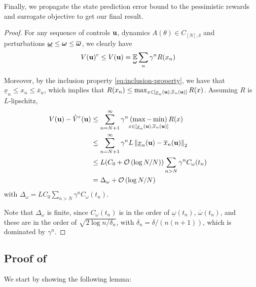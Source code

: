 \documentclass{article}
\begin{document}
Finally, we propagate the state prediction error bound to the pessimistic rewards and surrogate objective to get our final result.
\begin{proof}
  
 For any sequence of controls $\mathbf{u}$, dynamics $A(\theta)\in C_{[N],\delta}$ and perturbations $\underline{\bm{\omega}} \leq \bm{\omega} \leq \overline{\bm{\omega}}$, we clearly have 
 \[V(\mathbf{u})^r \leq V(\mathbf{u}) = \operatorname*{\mathbb{E}}_{\bm{\omega}}\sum_n \gamma^n R(x_n)\]
 
 Moreover, by the inclusion property \eqref{eq:inclusion-property}, we have that $\underline{x}_n \leq x_n \leq \overline{x}_n$, which implies that $R(x_n) \leq \max_{x\in[\underline{x}_n(\mathbf{u}), \overline{x}_n(\mathbf{u})]}  R(x)$. Assuming $R$ is $L$-lipschitz,
 \begin{align*}
     V(\mathbf{u}) - \hat{V}^r(\mathbf{u}) &\leq \sum_{n=N+1}^\infty \gamma^n \underset{{x\in[\underline{x}_n(\mathbf{u}), \overline{x}_n(\mathbf{u})]}}{(\max - \min)} R(x)\\
     &\leq \sum_{n=N+1}^\infty \gamma^n L \left\|\underline{x}_n(\mathbf{u}) - \overline{x}_n(\mathbf{u})\right\|_2\\
     &\leq L(C_0 + \mathcal{O}\left({\log N / N}\right)) \sum_{n>N} \gamma^n C_{\omega}(t_n)\\
     &= \Delta_\omega + \mathcal{O}\left({\log N / N}\right)
 \end{align*}
 with $\Delta_\omega = L C_0\sum_{n>N} \gamma^n C_{\omega}(t_n)$.
 
 Note that $\Delta_\omega$ is finite, since $C_{\omega}(t_n)$ is in the order of $\underline{\omega}(t_n)$, $\overline{\omega}(t_n)$, and these are in the order of $\sqrt{2\log n / \delta_n}$, with $\delta_n = \delta/(n(n+1))$, which is dominated by $\gamma^n$.
\end{proof}


\subsection{Proof of }

We start by showing the following lemma:
\end{document}
